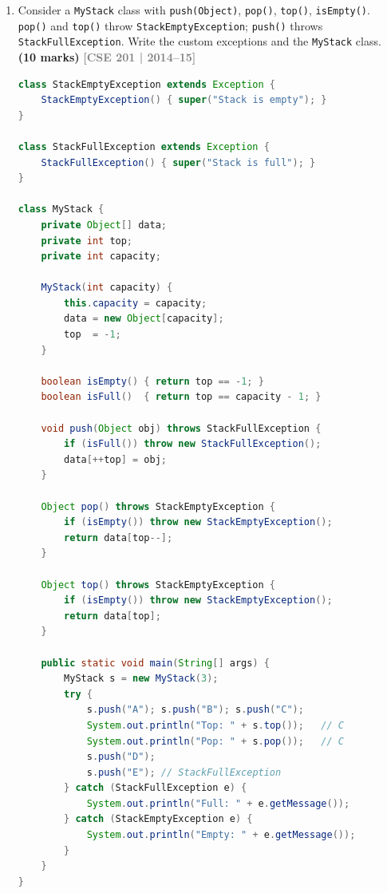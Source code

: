 \documentclass[12pt,a3paper]{article}
\newcommand{\yr}[1]{\hfill\textcolor{gray}{\small\textbf{[#1]}}}
\newcommand{\mk}[1]{\textcolor{orange!70!black}{\small\textbf{(#1 marks)}}}
\begin{document}
\begin{enumerate}
\item Consider a \texttt{MyStack} class with \texttt{push(Object)}, \texttt{pop()}, \texttt{top()}, \texttt{isEmpty()}. \texttt{pop()} and \texttt{top()} throw \texttt{StackEmptyException}; \texttt{push()} throws \texttt{StackFullException}. Write the custom exceptions and the \texttt{MyStack} class. \mk{10}
\yr{CSE 201 | 2014--15}

\begin{tcolorbox}[enhanced,breakable,ansbox,
  colback=cE!4,colframe=cE,boxrule=0.8pt,arc=5pt,
  title={\textbf{Answer --- MyStack with StackEmptyException and StackFullException}},
  fonttitle=\bfseries\color{white},colbacktitle=cE]
\begin{lstlisting}[language=Java]
class StackEmptyException extends Exception {
    StackEmptyException() { super("Stack is empty"); }
}

class StackFullException extends Exception {
    StackFullException() { super("Stack is full"); }
}

class MyStack {
    private Object[] data;
    private int top;
    private int capacity;

    MyStack(int capacity) {
        this.capacity = capacity;
        data = new Object[capacity];
        top  = -1;
    }

    boolean isEmpty() { return top == -1; }
    boolean isFull()  { return top == capacity - 1; }

    void push(Object obj) throws StackFullException {
        if (isFull()) throw new StackFullException();
        data[++top] = obj;
    }

    Object pop() throws StackEmptyException {
        if (isEmpty()) throw new StackEmptyException();
        return data[top--];
    }

    Object top() throws StackEmptyException {
        if (isEmpty()) throw new StackEmptyException();
        return data[top];
    }

    public static void main(String[] args) {
        MyStack s = new MyStack(3);
        try {
            s.push("A"); s.push("B"); s.push("C");
            System.out.println("Top: " + s.top());   // C
            System.out.println("Pop: " + s.pop());   // C
            s.push("D");
            s.push("E"); // StackFullException
        } catch (StackFullException e) {
            System.out.println("Full: " + e.getMessage());
        } catch (StackEmptyException e) {
            System.out.println("Empty: " + e.getMessage());
        }
    }
}
\end{lstlisting}
\end{tcolorbox}




\end{enumerate}
\end{document}
